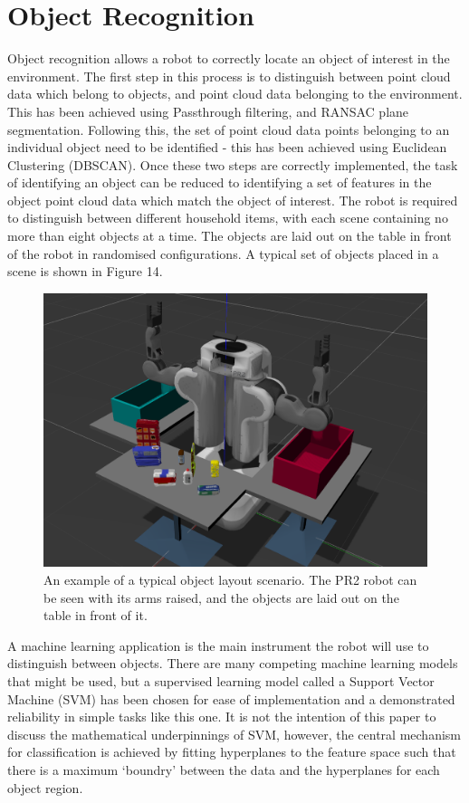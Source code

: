 \documentclass[a4paper]{article}
\begin{document}
\section{Object Recognition}
Object recognition allows a robot to correctly locate an object of interest in the environment. The first step in this process is to distinguish between point cloud data which belong to objects, and point cloud data belonging to the environment. This has been achieved using Passthrough filtering, and RANSAC plane segmentation. Following this, the set of point cloud data points belonging to an individual object need to be identified - this has been achieved using Euclidean Clustering (DBSCAN). Once these two steps are correctly implemented, the task of identifying an object can be reduced to identifying a set of features in the object point cloud data which  match the object of interest. The robot is required to distinguish between different household items, with each scene containing no more than eight objects at a time. The objects are laid out on the table in front of the robot in randomised configurations. A typical set of objects placed in a scene is shown in Figure 14.
\begin{figure}[h]
\centering
\includegraphics[scale=0.15]{object_layout}
\caption{An example of a typical object layout scenario. The PR2 robot can be seen with its arms raised, and the objects are laid out on the table in front of it.}
\end{figure}

A machine learning application is the main instrument the robot will use to distinguish between objects. There are many competing machine learning models that might be used, but a supervised learning model called a Support Vector Machine (SVM) has been chosen for ease of implementation and a demonstrated reliability in simple tasks like this one. It is not the intention of this paper to discuss the mathematical underpinnings of SVM, however, the central mechanism for classification is achieved by fitting hyperplanes to the feature space such that there is a maximum `boundry' between the data and the hyperplanes for each object region.
\newpage
\end{document}
